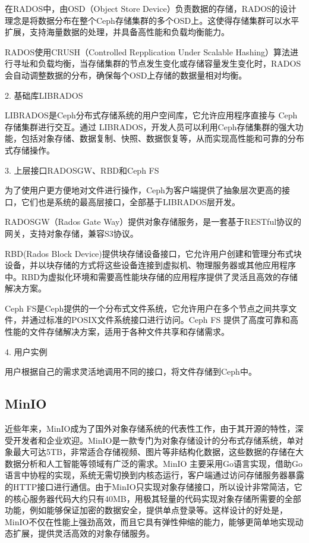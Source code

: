 在RADOS中，由OSD（Object Store Device）负责数据的存储，RADOS的设计理念是将数据分布在整个Ceph存储集群的多个OSD上。这使得存储集群可以水平扩展，支持海量数据的处理，并具备高性能和负载均衡能力。

RADOS使用CRUSH\cite{31}（Controlled Repplication Under Scalable Hashing）算法进行寻址和负载均衡，当存储集群的节点发生变化或存储容量发生变化时，RADOS会自动调整数据的分布，确保每个OSD上存储的数据量相对均衡。

2. 基础库LIBRADOS

LIBRADOS是Ceph分布式存储系统的用户空间库，它允许应用程序直接与 Ceph 存储集群进行交互。通过 LIBRADOS，开发人员可以利用Ceph存储集群的强大功能，包括对象存储、数据复制、快照、数据恢复等，从而实现高性能和可靠的分布式存储操作。

3. 上层接口RADOSGW、RBD和Ceph FS

为了使用户更方便地对文件进行操作，Ceph为客户端提供了抽象层次更高的接口，它们也是系统的最高层接口，全部基于LIBRADOS层开发\cite{32}。

RADOSGW（Rados Gate Way）提供对象存储服务，是⼀套基于RESTful协议的网关，支持对象存储，兼容S3协议。

RBD(Rados Block Device)提供块存储设备接口，它允许用户创建和管理分布式块设备，并以块存储的方式将这些设备连接到虚拟机、物理服务器或其他应用程序中。RBD为虚拟化环境和需要高性能块存储的应用程序提供了灵活且高效的存储解决方案。

Ceph FS是Ceph提供的一个分布式文件系统，它允许用户在多个节点之间共享文件，并通过标准的POSIX文件系统接口进行访问。Ceph FS 提供了高度可靠和高性能的文件存储解决方案，适用于各种文件共享和存储需求。

4. 用户实例

用户根据自己的需求灵活地调用不同的接口，将文件存储到Ceph中。

\subsection{MinIO}%
近些年来，MinIO成为了国外对象存储系统的代表性工作，由于其开源的特性，深受开发者和企业欢迎。MinIO是一款专门为对象存储设计的分布式存储系统，单对象最大可达5TB\cite{33}，非常适合存储视频、图片等非结构化数据，这些数据的存储在大数据分析和人工智能等领域有广泛的需求。MinIO 主要采用Go语言实现，借助Go语言中协程的实现，系统无需切换到内核态运行，客户端通过访问存储服务器暴露的HTTP接口进行通信。由于MinIO只实现对象存储接口，所以设计非常简洁，它的核心服务器代码大约只有40MB，用极其轻量的代码实现对象存储所需要的全部功能，例如能够保证加密的数据安全，提供单点登录等。这样设计的好处是，MinIO不仅在性能上强劲高效，而且它具有弹性伸缩的能力，能够更简单地实现动态扩展，提供灵活高效的对象存储服务。

